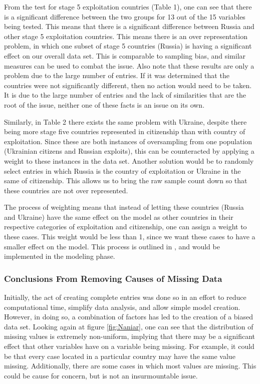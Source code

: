 \documentclass{article} %
\begin{document}
\FloatBarrier
From the test for stage 5 exploitation countries (Table 1), one can see that there is a significant difference between the two groups for 13 out of the 15 variables being tested. This means that there is a significant difference between Russia and other stage 5 exploitation countries. This means there is an over representation problem, in which one subset of stage 5 countries (Russia) is having a significant effect on our overall data set. This is comparable to sampling bias, and similar measures can be used to combat the issue. Also note that these results are only a problem due to the large number of entries. If it was determined that the countries were not significantly different, then no action would need to be taken. It is due to the large number of entries and the lack of similarities that are the root of the issue, neither one of these facts is an issue on its own.

Similarly, in Table 2 there exists the same problem with Ukraine, despite there being more stage five countries represented in citizenship than with country of exploitation. Since these are both instances of oversampling from one population (Ukrainian citizens and Russian exploits), this can be counteracted by applying a weight to these instances in the data set. Another solution would be to randomly select entries in which Russia is the country of exploitation or Ukraine in the same of citizenship. This allows us to bring the raw sample count down so that these countries are not over represented.

The process of weighting means that instead of letting these countries (Russia and Ukraine) have the same effect on the model as other countries in their respective categories of exploitation and citizenship, one can assign a weight to these cases. This weight would be less than 1, since we want these cases to have a smaller effect on the model. This process is outlined in \cite{Oversample}, and would be implemented in the modeling phase.



\subsubsection{Conclusions From Removing Causes of Missing Data}

Initially, the act of creating complete entries was done so in an effort to reduce computational time, simplify data analysis, and allow simple model creation. However, in doing so, a combination of factors has led to the creation of a biased data set. Looking again at figure \ref{fig:Naniar}, one can see that the distribution of missing values is extremely non-uniform, implying that there may be a significant effect that other variables have on a variable being missing. For example, it could be that every case located in a particular country may have the same value missing. Additionally, there are some cases in which most values are missing. This could be cause for concern, but is not an insurmountable issue.
\end{document}
